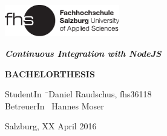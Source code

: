 \begin{titlepage}
\begin{center}

\includegraphics[width=5cm]{images/FHSLogo.pdf}

\vspace*{4cm}

\Large{
	\textit{\textbf{Continuous Integration with NodeJS}}
}

\vspace*{4cm}

\large{
	\textbf{BACHELORTHESIS}
}

\end{center}

\vfill

\begin{tabbing}
StudentIn \= \ Daniel Raudschus, fhs36118 \\
BetreuerIn \> \ Hannes Moser
\end{tabbing}

Salzburg, XX April 2016

\end{titlepage}
